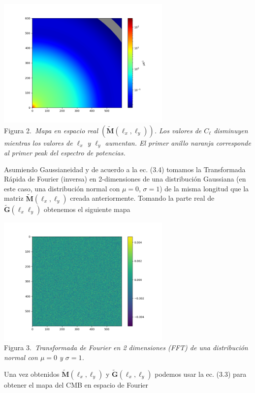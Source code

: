 \documentclass[twocolumn,letterpaper,spanish]{revtex4}
\numberwithin{equation}{section}
\begin{document}
\begin{center}
   \includegraphics[width=85mm]{M_tilde.png}\\
   Figura 2.\emph{\ Mapa en espacio real $(\tilde{\mathbf{M}}(\ell_x, \ell_y))$. Los valores de $C_{\ell}$ disminuyen mientras los valores de $\ell_x$ y $\ell_y$ aumentan. El primer anillo naranja corresponde al primer peak del espectro de potencias.}
\end{center}

Asumiendo Gaussianeidad y de acuerdo a la ec. (3.4) tomamos la Transformada R\'apida de Fourier (inversa) en 2-dimensiones de una distribuci\'on Gaussiana (en este caso, una distribuci\'on normal con $\mu=0$, $\sigma=1$) de la misma longitud que la matriz $\tilde{\mathbf{M}}(\ell_x, \ell_y)$ creada anteriormente. Tomando la parte real de $\tilde{\mathbf{G}}(\ell_x \ell_y)$ obtenemos el siguiente mapa

\begin{center}
   \includegraphics[width=85mm]{G_ell.png}\\
   Figura 3.\emph{\ Transformada de Fourier en 2 dimensiones (FFT) de una distribuci\'on normal con $\mu=0$ y $\sigma=1$.}
\end{center}

Una vez obtenidos $\tilde{\mathbf{M}}(\ell_x, \ell_y)$ y $\tilde{\mathbf{G}}(\ell_x, \ell_y)$ podemos usar la ec. (3.3) para obtener el mapa del CMB en espacio de Fourier
\end{document}
